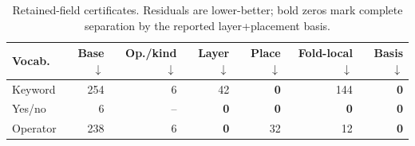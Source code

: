 \begin{table}[t]
\centering
\caption{Retained-field certificates. Residuals are lower-better; bold zeros mark complete separation by the reported layer+placement basis.}
\label{tab:repair-certificate-summary}
\footnotesize
\setlength{\tabcolsep}{2.6pt}
\begin{tabular}{@{}lrrrrrr@{}}
\toprule
Vocab. & Base$\downarrow$ & Op./kind$\downarrow$ & Layer$\downarrow$ & Place$\downarrow$ & Fold-local$\downarrow$ & Basis$\downarrow$ \\
\midrule
Keyword & 254 & 6 & 42 & \textbf{0} & 144 & \textbf{0} \\
Yes/no & 6 & -- & \textbf{0} & \textbf{0} & \textbf{0} & \textbf{0} \\
Operator & 238 & 6 & \textbf{0} & 32 & 12 & \textbf{0} \\
\bottomrule
\end{tabular}
\end{table}
